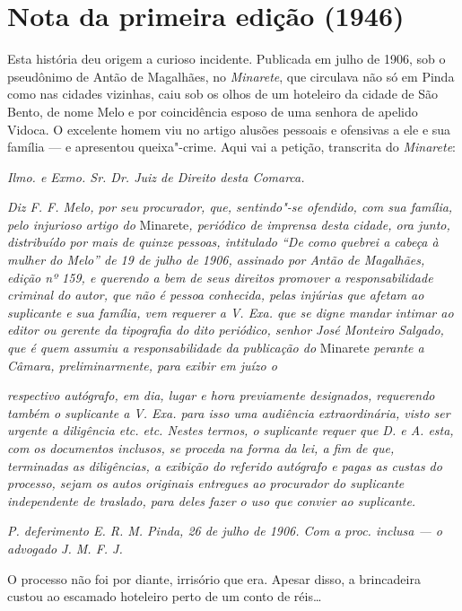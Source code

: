 \section*{Nota da primeira edição (1946)}

Esta história deu origem a curioso incidente. Publicada em julho de
1906, sob o pseudônimo de Antão de Magalhães, no \emph{Minarete}, que
circulava não só em Pinda como nas cidades vizinhas, caiu sob os olhos
de um hoteleiro da cidade de São Bento, de nome Melo e por coincidência
esposo de uma senhora de apelido Vidoca. O excelente homem viu no artigo
alusões pessoais e ofensivas a ele e sua família --- e apresentou
queixa"-crime. Aqui vai a petição, transcrita do \emph{Minarete}:

\emph{Ilmo. e Exmo. Sr. Dr. Juiz de Direito desta Comarca.}

\emph{Diz F. F. Melo, por seu procurador, que, sentindo"-se ofendido, com
sua família, pelo injurioso artigo do} Minarete\emph{, periódico de
imprensa desta cidade, ora junto, distribuído por mais de quinze
pessoas, intitulado ``De como quebrei a cabeça à mulher do Melo'' de 19
de julho de 1906, assinado por Antão de Magalhães, edição nº 159, e
querendo a bem de seus direitos promover a responsabilidade criminal do
autor, que não é pessoa conhecida, pelas injúrias que afetam ao
suplicante e sua família, vem requerer a V. Exa. que se digne mandar
intimar ao editor ou gerente da tipografia do dito periódico, senhor
José Monteiro Salgado, que é quem assumiu a responsabilidade da
publicação do} Minarete \emph{perante a Câmara, preliminarmente, para
exibir em juízo o}

\emph{respectivo autógrafo, em dia, lugar e hora previamente designados,
requerendo também o suplicante a V. Exa. para isso uma audiência
extraordinária, visto ser urgente a diligência etc. etc. Nestes termos,
o suplicante requer que D. e A. esta, com os documentos inclusos, se
proceda na forma da lei, a fim de que, terminadas as diligências, a
exibição do referido autógrafo e pagas as custas do processo, sejam os
autos originais entregues ao procurador do suplicante independente de
traslado, para deles fazer o uso que convier ao suplicante.}

\emph{P. deferimento E. R. M. Pinda, 26 de julho de 1906. Com a proc.
inclusa --- o advogado J. M. F. J.}

O processo não foi por diante, irrisório que era. Apesar disso, a
brincadeira custou ao escamado hoteleiro perto de um conto de réis\ldots{}


